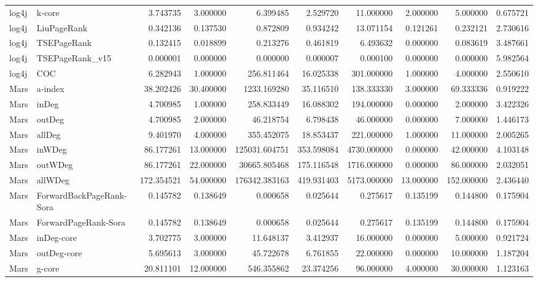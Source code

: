 \begin{tabular}{llrrrrrrrr}
log4j & k-core & 3.743735 & 3.000000 & 6.399485 & 2.529720 & 11.000000 & 2.000000 & 5.000000 & 0.675721 \\
log4j & LiuPageRank & 0.342136 & 0.137530 & 0.872809 & 0.934242 & 13.071154 & 0.121261 & 0.232121 & 2.730616 \\
log4j & TSEPageRank & 0.132415 & 0.018899 & 0.213276 & 0.461819 & 6.493632 & 0.000000 & 0.083619 & 3.487661 \\
log4j & TSEPageRank_v15 & 0.000001 & 0.000000 & 0.000000 & 0.000007 & 0.000100 & 0.000000 & 0.000000 & 5.982564 \\
log4j & COC & 6.282943 & 1.000000 & 256.811464 & 16.025338 & 301.000000 & 1.000000 & 4.000000 & 2.550610 \\
Mars & a-index & 38.202426 & 30.400000 & 1233.169280 & 35.116510 & 138.333330 & 3.000000 & 69.333336 & 0.919222 \\
Mars & inDeg & 4.700985 & 1.000000 & 258.833449 & 16.088302 & 194.000000 & 0.000000 & 2.000000 & 3.422326 \\
Mars & outDeg & 4.700985 & 2.000000 & 46.218754 & 6.798438 & 46.000000 & 0.000000 & 7.000000 & 1.446173 \\
Mars & allDeg & 9.401970 & 4.000000 & 355.452075 & 18.853437 & 221.000000 & 1.000000 & 11.000000 & 2.005265 \\
Mars & inWDeg & 86.177261 & 13.000000 & 125031.604751 & 353.598084 & 4730.000000 & 0.000000 & 42.000000 & 4.103148 \\
Mars & outWDeg & 86.177261 & 22.000000 & 30665.805468 & 175.116548 & 1716.000000 & 0.000000 & 86.000000 & 2.032051 \\
Mars & allWDeg & 172.354521 & 54.000000 & 176342.383163 & 419.931403 & 5173.000000 & 13.000000 & 152.000000 & 2.436440 \\
Mars & ForwardBackPageRank-Sora & 0.145782 & 0.138649 & 0.000658 & 0.025644 & 0.275617 & 0.135199 & 0.144800 & 0.175904 \\
Mars & ForwardPageRank-Sora & 0.145782 & 0.138649 & 0.000658 & 0.025644 & 0.275617 & 0.135199 & 0.144800 & 0.175904 \\
Mars & inDeg-core & 3.702775 & 3.000000 & 11.648137 & 3.412937 & 16.000000 & 0.000000 & 5.000000 & 0.921724 \\
Mars & outDeg-core & 5.695613 & 3.000000 & 45.722678 & 6.761855 & 22.000000 & 0.000000 & 10.000000 & 1.187204 \\
Mars & g-core & 20.811101 & 12.000000 & 546.355862 & 23.374256 & 96.000000 & 4.000000 & 30.000000 & 1.123163 \\

\end{tabular}
